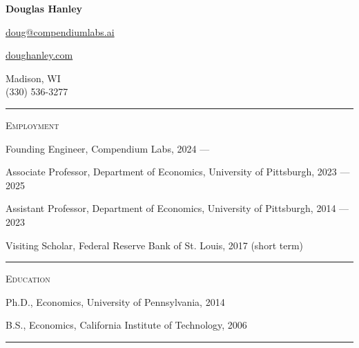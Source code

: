 \documentclass{article}
\begin{document}
\thispagestyle{empty}

\begin{center}
{\LARGE \textbf{Douglas Hanley}}
\end{center}

\begin{center}
\parbox{2.0in}{
\begin{flushright}
\href{mailto:doug@compendiumlabs.ai}{doug@compendiumlabs.ai} 

\href{http://doughanley.com/}{doughanley.com}
\end{flushright}
}
\hspace{0.5cm}
\parbox{2.0in}{
Madison, WI \\
(330) 536-3277
}
\end{center}

\hspace{-0.025\textwidth}\rule{1.05\textwidth}{0.1mm}

\vspace{0.3cm}


\parbox{\textwidth}{
\parbox[t]{0.28\textwidth}{ \raggedright \noindent \textsc{ Employment } }
\parbox[t]{0.72\textwidth}{ \raggedright

Founding Engineer, Compendium Labs, 2024 —
\vspace{0.27cm}

Associate Professor, Department of Economics, University of Pittsburgh, 2023 — 2025
\vspace{0.27cm}

Assistant Professor, Department of Economics, University of Pittsburgh, 2014 — 2023
\vspace{0.27cm}

Visiting Scholar, Federal Reserve Bank of St. Louis, 2017 (short term)
\vspace{0.27cm}

}
\textcolor{light-gray}{\hrule}
}
\vspace{0.3cm}

\parbox{\textwidth}{
\parbox[t]{0.28\textwidth}{ \raggedright \noindent \textsc{ Education } }
\parbox[t]{0.72\textwidth}{ \raggedright

Ph.D., Economics, University of Pennsylvania, 2014
\vspace{0.27cm}

B.S., Economics, California Institute of Technology, 2006
\vspace{0.27cm}

}
\textcolor{light-gray}{\hrule}
}
\vspace{0.3cm}
\end{document}
